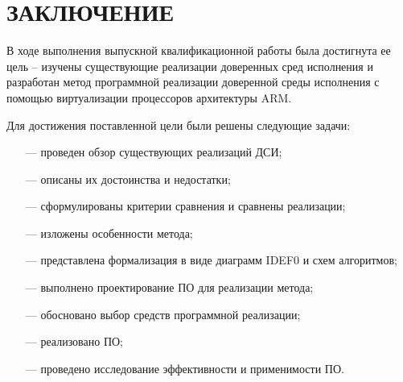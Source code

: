\section*{ЗАКЛЮЧЕНИЕ}

В ходе выполнения выпускной квалификационной работы была достигнута ее цель -- изучены существующие реализации доверенных сред исполнения и разработан метод программной реализации доверенной среды исполнения с помощью виртуализации процессоров архитектуры ARM.

Для достижения поставленной цели были решены следующие задачи:

\begin{itemize}
	\item [---] проведен обзор существующих реализаций ДСИ;
	\item [---] описаны их достоинства и недостатки;
	\item [---] сформулированы критерии сравнения и сравнены реализации;
	\item [---] изложены особенности метода;
	\item [---] представлена формализация в виде диаграмм IDEF0 и схем алгоритмов;
	\item [---] выполнено проектирование ПО для реализации метода;
	\item [---] обосновано выбор средств программной реализации;
	\item [---] реализовано ПО;
	\item [---] проведено исследование эффективности и применимости ПО.
\end{itemize}

\pagebreak